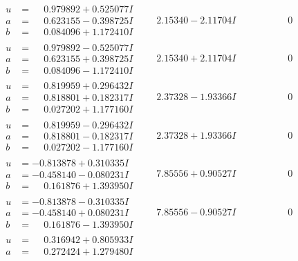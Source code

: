\documentclass[1p]{elsarticle_modified}
\theoremstyle{definition}
\begin{document}
$$\begin{array}{c|c|c}
\begin{aligned}
u &= \phantom{-}0.979892 + 0.525077 I \\
a &= \phantom{-}0.623155 - 0.398725 I \\
b &= \phantom{-}0.084096 + 1.172410 I\end{aligned}
 & \phantom{-}2.15340 - 2.11704 I & \phantom{-0.000000 } 0 \\ \hline\begin{aligned}
u &= \phantom{-}0.979892 - 0.525077 I \\
a &= \phantom{-}0.623155 + 0.398725 I \\
b &= \phantom{-}0.084096 - 1.172410 I\end{aligned}
 & \phantom{-}2.15340 + 2.11704 I & \phantom{-0.000000 } 0 \\ \hline\begin{aligned}
u &= \phantom{-}0.819959 + 0.296432 I \\
a &= \phantom{-}0.818801 + 0.182317 I \\
b &= \phantom{-}0.027202 + 1.177160 I\end{aligned}
 & \phantom{-}2.37328 - 1.93366 I & \phantom{-0.000000 } 0 \\ \hline\begin{aligned}
u &= \phantom{-}0.819959 - 0.296432 I \\
a &= \phantom{-}0.818801 - 0.182317 I \\
b &= \phantom{-}0.027202 - 1.177160 I\end{aligned}
 & \phantom{-}2.37328 + 1.93366 I & \phantom{-0.000000 } 0 \\ \hline\begin{aligned}
u &= -0.813878 + 0.310335 I \\
a &= -0.458140 - 0.080231 I \\
b &= \phantom{-}0.161876 + 1.393950 I\end{aligned}
 & \phantom{-}7.85556 + 0.90527 I & \phantom{-0.000000 } 0 \\ \hline\begin{aligned}
u &= -0.813878 - 0.310335 I \\
a &= -0.458140 + 0.080231 I \\
b &= \phantom{-}0.161876 - 1.393950 I\end{aligned}
 & \phantom{-}7.85556 - 0.90527 I & \phantom{-0.000000 } 0 \\ \hline\begin{aligned}
u &= \phantom{-}0.316942 + 0.805933 I \\
a &= \phantom{-}0.272424 + 1.279480 I \\

\end{aligned}
\end{array}$$
\end{document}
